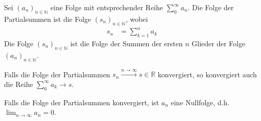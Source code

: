 \documentclass[12pt]{article}
\newcommand{\R}{\mathbb{R}} %
\newcommand{\N}{\mathbb{N}}
\newenvironment{definition}[2][Definition]{\begin{trivlist}
        \item[\hskip \labelsep {\bfseries #1}\hskip \labelsep {\bfseries #2.}]}{\flushright{$\square$}\end{trivlist}}
\newenvironment{remark}[2][Bemerkung]{\begin{trivlist}
        \item[\hskip \labelsep {\bfseries #1}\hskip \labelsep {\bfseries #2.}]}{\end{trivlist}}
\begin{document}
\begin{definition}{[Folge der Partialsummen]}
    Sei $(a_n)_{n\in\N}$ eine Folge mit entsprechender Reihe $\sum_{0}^{\infty}a_n$. Die Folge der Partialsummen ist die Folge $(s_n)_{n\in\N}$, wobei
    \begin{align*}
        s_n & =\sum_{k=1}^{n}a_k
    \end{align*}
    Die Folge $(s_n)_{n\in\N}$ ist die Folge der Summen der ersten $n$ Glieder der Folge $(a_n)_{n\in\N}$.

    Falls die Folge der Partialsummen $s_n\xrightarrow{n \to \infty} s\in\R$
    konvergiert, so konvergiert auch die Reihe
    $\sum_{0}^{\infty}a_k\xrightarrow{}s$.

    \begin{remark}{} Falls die Folge der Partialsummen konvergiert, ist $a_n$ eine Nullfolge, d.h.\ $\lim_{n\to\infty}a_n=0$.
    \end{remark}
\end{definition}
\end{document}
